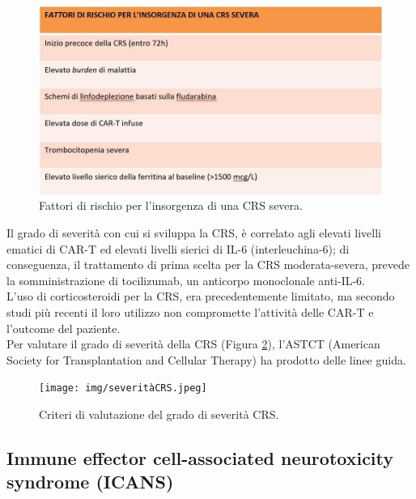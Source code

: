 \begin{figure}[H]
    \begin{center}
    \includegraphics[width=0.7\columnwidth]{img/rischioCRS.jpeg}
    \end{center}
    \caption{Fattori di rischio per l’insorgenza di una CRS severa. 
    \cite{EMATOCART}}
    \label{fig:FIGURE_3.11}
\end{figure}

Il grado di severità con cui si sviluppa la CRS, è correlato agli elevati livelli ematici di CAR-T ed elevati livelli 
sierici di IL-6 (interleuchina-6); di conseguenza, il trattamento di prima scelta per la CRS moderata-severa, 
prevede la somministrazione di tocilizumab, un anticorpo monoclonale anti-IL-6\cite{EMATOCART}.\\
L’uso di corticosteroidi per la CRS, era precedentemente limitato, ma secondo studi più recenti il loro utilizzo 
non compromette l'attività delle CAR-T e l’outcome del paziente\cite{Cortico}.\\
Per valutare il grado di severità della CRS (Figura \ref{fig:FIGURE_5.4}), l’ASTCT (American Society for Transplantation 
and Cellular Therapy) ha prodotto delle linee guida\cite{LEE2019625}.

\begin{figure}[H]
    \begin{center}
    \texttt{[image: img/severitàCRS.jpeg]}
    \end{center}
    \caption{Criteri di valutazione del grado di severità CRS.
    \cite{EMATOCART}}
    \label{fig:FIGURE_5.4}
\end{figure}

\subsection{Immune effector cell-associated neurotoxicity syndrome (ICANS)}

